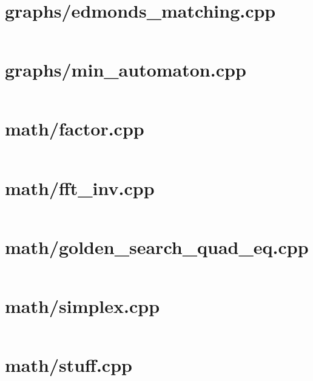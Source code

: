 \newpage
\section{graphs/edmonds\_matching.cpp}
\fontsize{7.9}{8.5}\selectfont
\inputminted[numbersep=1pt,linenos,breaklines]{c++}{/home/ifsmirnov/olymp/teambook/tmp.qSsNloJNks/tmp.lW3IrKp7lw}

\newpage
\section{graphs/min\_automaton.cpp}
\fontsize{7.9}{8.5}\selectfont
\inputminted[numbersep=1pt,linenos,breaklines]{c++}{/home/ifsmirnov/olymp/teambook/tmp.qSsNloJNks/tmp.EzELiLCPQV}

\newpage
\section{math/factor.cpp}
\fontsize{7.9}{8.5}\selectfont
\inputminted[numbersep=1pt,linenos,breaklines]{c++}{/home/ifsmirnov/olymp/teambook/tmp.qSsNloJNks/tmp.0BUkyErgtR}

\newpage
\section{math/fft\_inv.cpp}
\fontsize{7.9}{8.5}\selectfont
\inputminted[numbersep=1pt,linenos,breaklines]{c++}{/home/ifsmirnov/olymp/teambook/tmp.qSsNloJNks/tmp.Eyo5mgH4uz}

\newpage
\section{math/golden\_search\_quad\_eq.cpp}
\fontsize{7.9}{8.5}\selectfont
\inputminted[numbersep=1pt,linenos,breaklines]{c++}{/home/ifsmirnov/olymp/teambook/tmp.qSsNloJNks/tmp.v7UWym2XXV}

\section{math/simplex.cpp}
\fontsize{7.9}{8.5}\selectfont
\inputminted[numbersep=1pt,linenos,breaklines]{c++}{/home/ifsmirnov/olymp/teambook/tmp.qSsNloJNks/tmp.dZfaYYGQcq}

\newpage
\section{math/stuff.cpp}
\fontsize{7.9}{8.5}\selectfont
\inputminted[numbersep=1pt,linenos,breaklines]{c++}{/home/ifsmirnov/olymp/teambook/tmp.qSsNloJNks/tmp.iDCMOEE4Uc}

